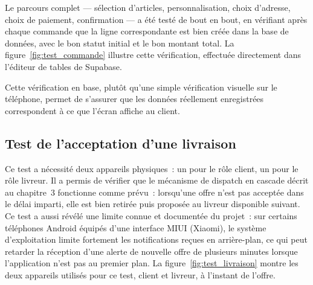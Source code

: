\documentclass[12pt,fleqn,a4paper]{report}
\begin{document}
\begin{justify}
Le parcours complet — sélection d'articles, personnalisation, choix d'adresse, choix de paiement, confirmation — a été testé de bout en bout, en vérifiant après chaque commande que la ligne correspondante est bien créée dans la base de données, avec le bon statut initial et le bon montant total. La figure~\ref{fig:test_commande} illustre cette vérification, effectuée directement dans l'éditeur de tables de Supabase.


Cette vérification en base, plutôt qu'une simple vérification visuelle sur le téléphone, permet de s'assurer que les données réellement enregistrées correspondent à ce que l'écran affiche au client.

\subsection{Test de l'acceptation d'une livraison}

Ce test a nécessité deux appareils physiques~: un pour le rôle client, un pour le rôle livreur. Il a permis de vérifier que le mécanisme de dispatch en cascade décrit au chapitre~3 fonctionne comme prévu~: lorsqu'une offre n'est pas acceptée dans le délai imparti, elle est bien retirée puis proposée au livreur disponible suivant. Ce test a aussi révélé une limite connue et documentée du projet~: sur certains téléphones Android équipés d'une interface MIUI (Xiaomi), le système d'exploitation limite fortement les notifications reçues en arrière-plan, ce qui peut retarder la réception d'une alerte de nouvelle offre de plusieurs minutes lorsque l'application n'est pas au premier plan. La figure~\ref{fig:test_livraison} montre les deux appareils utilisés pour ce test, client et livreur, à l'instant de l'offre.



\end{justify}
\end{document}

